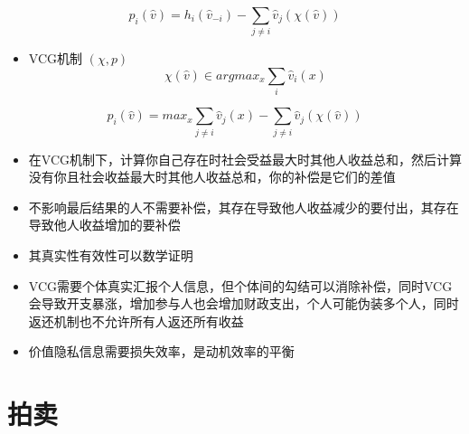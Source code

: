 \documentclass[]{book}
\providecommand{\tightlist}{%
  \setlength{\itemsep}{0pt}\setlength{\parskip}{0pt}}
\begin{document}
\[p_i(\hat v) = h_i(\hat v_{-i}) - \sum_{j\neq i} \hat v_j(\chi(\hat v))\]

\begin{itemize}
\tightlist
\item
  VCG机制 \((\chi,p)\)
  \[\chi (\hat v) \in arg max_x \sum_i \hat v_i(x)\]
\end{itemize}

\[p_i(\hat v) = max_x\sum_{j\neq i} \hat v_j(x) - \sum_{j\neq i} \hat v_j(\chi(\hat v))\]

\begin{itemize}
\tightlist
\item
  在VCG机制下，计算你自己存在时社会受益最大时其他人收益总和，然后计算没有你且社会收益最大时其他人收益总和，你的补偿是它们的差值
\item
  不影响最后结果的人不需要补偿，其存在导致他人收益减少的要付出，其存在导致他人收益增加的要补偿
\item
  其真实性有效性可以数学证明
\item
  VCG需要个体真实汇报个人信息，但个体间的勾结可以消除补偿，同时VCG会导致开支暴涨，增加参与人也会增加财政支出，个人可能伪装多个人，同时返还机制也不允许所有人返还所有收益
\item
  价值隐私信息需要损失效率，是动机效率的平衡
\end{itemize}

\section{拍卖}
\end{document}
